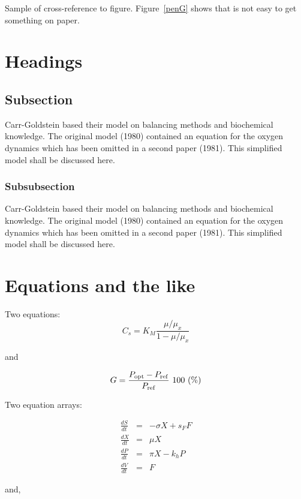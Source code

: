 \documentclass[ss]{imsart}
\numberwithin{equation}{section}
\theoremstyle{plain}
\begin{document}
Sample of cross-reference to figure.
Figure~\ref{penG} shows that is not easy to get something on paper.

\section{Headings}

\subsection{Subsection}
Carr-Goldstein based their model on balancing methods and
biochemical know\-ledge. The original model (1980) contained an equation for the
oxygen dynamics which has been omitted in a second paper
(1981). This simplified model shall be discussed here.

\subsubsection{Subsubsection}
Carr-Goldstein
based their model on balancing methods and
biochemical know\-ledge. The original model (1980) contained an equation for the
oxygen dynamics which has been omitted in a second paper
(1981). This simplified model shall be discussed here.

\section{Equations and the like}

Two equations:
\begin{equation}
    C_{s}  =  K_{M} \frac{\mu/\mu_{x}}{1-\mu/\mu_{x}} \label{ccs}
\end{equation}

and

\begin{equation}
    G = \frac{P_{\rm opt} - P_{\rm ref}}{P_{\rm ref}} \mbox{\ }100 \mbox{\ }(\%)
\end{equation}

Two equation arrays:

\begin{eqnarray}
  \frac{dS}{dt} & = & - \sigma X + s_{F} F\\
  \frac{dX}{dt} & = &   \mu    X\\
  \frac{dP}{dt} & = &   \pi    X - k_{h} P\\
  \frac{dV}{dt} & = &   F
\end{eqnarray}

and,
\end{document}
